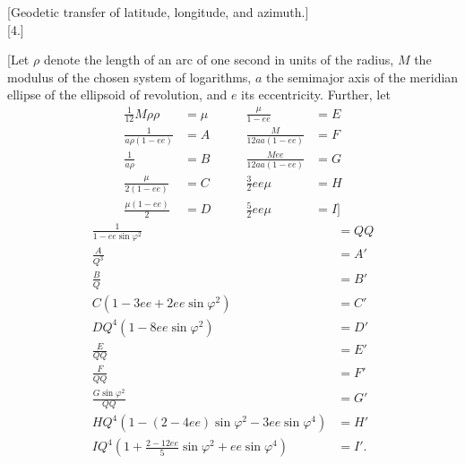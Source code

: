 \par\clearpage
\noindent{}\makebox[12mm][r]{}\par\medskip

\bigskip
\begin{center}
[Geodetic transfer of latitude, longitude, and azimuth.]\\[.8ex]
{[4.]}
\end{center}
[Let \(\rho\) denote the length of an arc of one second in units of the
radius, \(M\) the modulus of the chosen system of logarithms, \(a\) the
semimajor axis of the meridian ellipse of the ellipsoid of revolution, and \(e\) its
eccentricity. Further, let
\[
\begin{alignedat}{2}
\tfrac1{12}M\rho\rho&=\mu &\qquad \frac{\mu}{1-ee}&=E\\
\frac1{a\rho(1-ee)}&=A &\qquad \frac{M}{12aa(1-ee)}&=F\\
\frac1{a\rho}&=B &\qquad \frac{Mee}{12aa(1-ee)}&=G\\
\frac{\mu}{2(1-ee)}&=C &\qquad \tfrac32 ee\mu&=H\\
\frac{\mu(1-ee)}2&=D &\qquad \tfrac52 ee\mu&=I]
\end{alignedat}
\]
\[
\begin{aligned}
\frac1{1-ee\sin\varphi^2}&=QQ\\
\frac A{Q^3}&=A'\\
\frac BQ&=B'\\[.5ex]
C(1-3ee+2ee\sin\varphi^2)&=C'\\
DQ^4(1-8ee\sin\varphi^2)&=D'\\[.5ex]
\frac E{QQ}&=E'\\
\frac F{QQ}&=F'\\
\frac{G\sin\varphi^2}{QQ}&=G'\\[.5ex]
HQ^4(1-(2-4ee)\sin\varphi^2-3ee\sin\varphi^4)&=H'\\
IQ^4\left(1+\frac{2-12ee}{5}\sin\varphi^2+ee\sin\varphi^4\right)&=I'.
\end{aligned}
\]
\par

\par\clearpage
\noindent\makebox[12mm][l]{}\par\medskip

